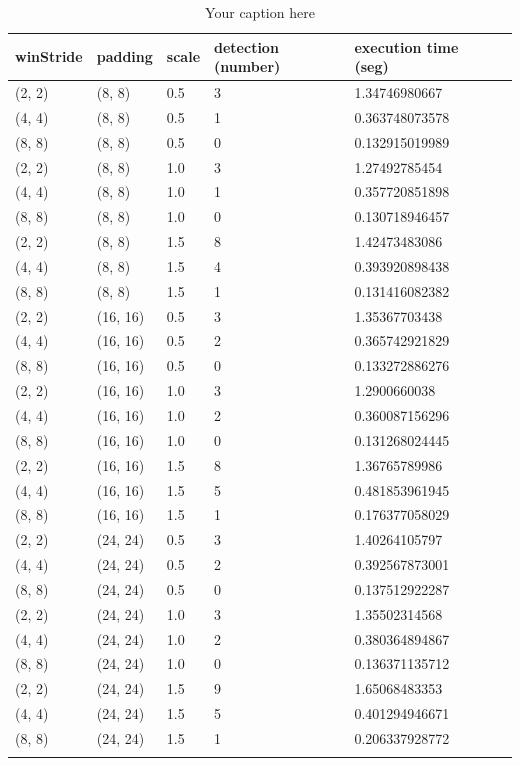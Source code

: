 \begin{longtable}{|l|l|l|l|l|l|} 
	\hline
	\textbf{winStride} & \textbf{padding} & \textbf{scale} & \textbf{detection (number)} & \textbf{execution time (seg)} \\ \hline
(2, 2) & (8, 8) & 0.5 & 3 & 1.34746980667 \\ \hline
(4, 4) & (8, 8) & 0.5 & 1 & 0.363748073578 \\ \hline
(8, 8) & (8, 8) & 0.5 & 0 & 0.132915019989 \\ \hline
(2, 2) & (8, 8) & 1.0 & 3 & 1.27492785454 \\ \hline
(4, 4) & (8, 8) & 1.0 & 1 & 0.357720851898 \\ \hline
(8, 8) & (8, 8) & 1.0 & 0 & 0.130718946457 \\ \hline
(2, 2) & (8, 8) & 1.5 & 8 & 1.42473483086 \\ \hline
(4, 4) & (8, 8) & 1.5 & 4 & 0.393920898438 \\ \hline
(8, 8) & (8, 8) & 1.5 & 1 & 0.131416082382 \\ \hline
(2, 2) & (16, 16) & 0.5 & 3 & 1.35367703438 \\ \hline
(4, 4) & (16, 16) & 0.5 & 2 & 0.365742921829 \\ \hline
(8, 8) & (16, 16) & 0.5 & 0 & 0.133272886276 \\ \hline
(2, 2) & (16, 16) & 1.0 & 3 & 1.2900660038 \\ \hline
(4, 4) & (16, 16) & 1.0 & 2 & 0.360087156296 \\ \hline
(8, 8) & (16, 16) & 1.0 & 0 & 0.131268024445 \\ \hline
(2, 2) & (16, 16) & 1.5 & 8 & 1.36765789986 \\ \hline
(4, 4) & (16, 16) & 1.5 & 5 & 0.481853961945 \\ \hline
(8, 8) & (16, 16) & 1.5 & 1 & 0.176377058029 \\ \hline
(2, 2) & (24, 24) & 0.5 & 3 & 1.40264105797 \\ \hline
(4, 4) & (24, 24) & 0.5 & 2 & 0.392567873001 \\ \hline
(8, 8) & (24, 24) & 0.5 & 0 & 0.137512922287 \\ \hline
(2, 2) & (24, 24) & 1.0 & 3 & 1.35502314568 \\ \hline
(4, 4) & (24, 24) & 1.0 & 2 & 0.380364894867 \\ \hline
(8, 8) & (24, 24) & 1.0 & 0 & 0.136371135712 \\ \hline
(2, 2) & (24, 24) & 1.5 & 9 & 1.65068483353 \\ \hline
(4, 4) & (24, 24) & 1.5 & 5 & 0.401294946671 \\ \hline
(8, 8) & (24, 24) & 1.5 & 1 & 0.206337928772 \\ \hline

	
	\caption{Your caption here} %
	\label{tab:myfirstlongtable}
\end{longtable}
